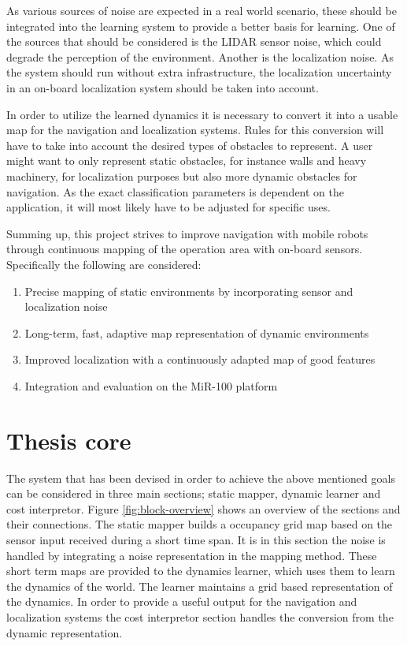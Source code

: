  
As various sources of noise are expected in a real world scenario, these should be integrated into the learning system to provide a better basis for learning. One of the sources that should be considered is the LIDAR sensor noise, which could degrade the perception of the environment. 
Another is the localization noise.
As the system should run without extra infrastructure, the localization uncertainty in an on-board localization system should be taken into account.


In order to utilize the learned dynamics it is necessary to convert it into a usable map for the navigation and localization systems. Rules for this conversion will have to take into account the desired types of obstacles to represent. 
A user might want to only represent static obstacles, for instance walls and heavy machinery, for localization purposes but also more dynamic obstacles for navigation. 
As the exact classification parameters is dependent on the  application, it will most likely have to be adjusted for specific uses. 

Summing up, this project strives to improve navigation with mobile robots through continuous mapping of the operation area with on-board sensors. 
Specifically the following are considered:
\begin{enumerate}
    \item Precise mapping of static environments by incorporating sensor and localization noise
    \item Long-term, fast, adaptive map representation of dynamic environments
    \item Improved localization with a continuously adapted map of good features
    \item Integration and evaluation on the MiR-100 platform
\end{enumerate}

\section{Thesis core}
The system that has been devised in order to achieve the above mentioned goals can be considered in three main sections; static mapper, dynamic learner and cost interpretor. 
Figure \ref{fig:block-overview} shows an overview of the sections and their connections. 
The static mapper builds a occupancy grid map based on the sensor input received during a short time span. It is in this section the noise is handled by integrating a noise representation in the mapping method.
These short term maps are provided to the dynamics learner, which uses them to learn the dynamics of the world. The learner maintains a grid based representation of the dynamics. 
In order to provide a useful output for the navigation and localization systems the cost interpretor section handles the conversion from the dynamic representation. 

